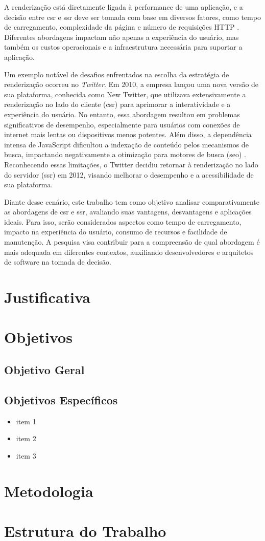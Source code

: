 A renderização está diretamente ligada à performance de uma aplicação, e a decisão entre \acrshort{csr} e \acrshort{ssr} deve ser tomada com base em diversos fatores, como tempo de carregamento, complexidade da página e número de requisições HTTP \cite{webPerformance}. Diferentes abordagens impactam não apenas a experiência do usuário, mas também os custos operacionais e a infraestrutura necessária para suportar a aplicação.

Um exemplo notável de desafios enfrentados na escolha da estratégia de renderização ocorreu no \emph{Twitter}. Em 2010, a empresa lançou uma nova versão de sua plataforma, conhecida como New Twitter, que utilizava extensivamente a renderização no lado do cliente (\acrshort{csr}) para aprimorar a interatividade e a experiência do usuário. No entanto, essa abordagem resultou em problemas significativos de desempenho, especialmente para usuários com conexões de internet mais lentas ou dispositivos menos potentes. Além disso, a dependência intensa de JavaScript dificultou a indexação de conteúdo pelos mecanismos de busca, impactando negativamente a otimização para motores de busca (\acrshort{seo}) \cite{twitter}. Reconhecendo essas limitações, o Twitter decidiu retornar à renderização no lado do servidor (\acrshort{ssr}) em 2012, visando melhorar o desempenho e a acessibilidade de sua plataforma.

Diante desse cenário, este trabalho tem como objetivo analisar comparativamente as abordagens de \acrshort{csr} e \acrshort{ssr}, avaliando suas vantagens, desvantagens e aplicações ideais. Para isso, serão considerados aspectos como tempo de carregamento, impacto na experiência do usuário, consumo de recursos e facilidade de manutenção. A pesquisa visa contribuir para a compreensão de qual abordagem é mais adequada em diferentes contextos, auxiliando desenvolvedores e arquitetos de software na tomada de decisão.


\section{Justificativa}


\section{Objetivos}

\subsection{Objetivo Geral}


\subsection{Objetivos Específicos}
\begin{itemize}
\item item 1
\item item 2
\item item 3
\end{itemize}

\section{Metodologia}


\section{Estrutura do Trabalho}

